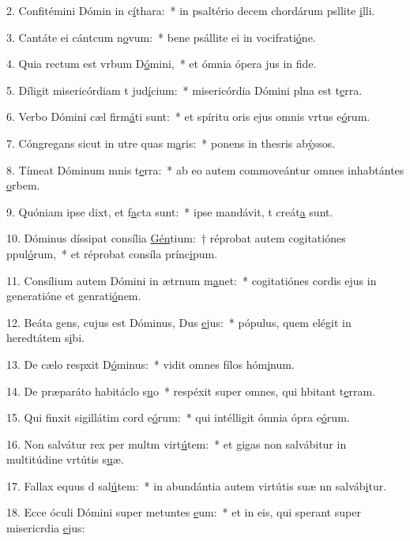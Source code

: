 2. Confitémini Dómin in c\uline{í}thara:~* in psaltério decem chordárum psllite \uline{i}lli.\par 
3. Cantáte ei cántcum n\uline{o}vum:~* bene psállite ei in vocifrati\uline{ó}ne.\par 
4. Quia rectum est vrbum D\uline{ó}mini,~* et ómnia ópera jus in f\uline{i}de.\par 
5. Díligit misericórdiam t jud\uline{í}cium:~* misericórdia Dómini plna est t\uline{e}rra.\par 
6. Verbo Dómini cæl firm\uline{á}ti sunt:~* et spíritu oris ejus omnis vrtus e\uline{ó}rum.\par 
7. Cóngregans sicut in utre quas m\uline{a}ris:~* ponens in thesris ab\uline{ý}ssos.\par 
8. Tímeat Dóminum mnis t\uline{e}rra:~* ab eo autem commoveántur omnes inhabtántes \uline{o}rbem.\par 
9. Quóniam ipse dixt, et f\uline{a}cta sunt:~* ipse mandávit, t creát\uline{a} sunt.\par 
10. Dóminus díssipat consília \uline{Gén}tium:~† réprobat autem cogitatiónes ppul\uline{ó}rum,~* et réprobat consíla prínc\uline{i}pum.\par 
11. Consílium autem Dómini in ætrnum m\uline{a}net:~* cogitatiónes cordis ejus in generatióne et genrati\uline{ó}nem.\par 
12. Beáta gens, cujus est Dóminus, Dus \uline{e}jus:~* pópulus, quem elégit in heredtátem s\uline{i}bi.\par 
13. De cælo respxit D\uline{ó}minus:~* vidit omnes fílos hóm\uline{i}num.\par 
14. De præparáto habitáclo s\uline{u}o~* respéxit super omnes, qui hbitant t\uline{e}rram.\par 
15. Qui finxit sigillátim cord e\uline{ó}rum:~* qui intélligit ómnia ópra e\uline{ó}rum.\par 
16. Non salvátur rex per multm virt\uline{ú}tem:~* et gigas non salvábitur in multitúdine vrtútis s\uline{u}æ.\par 
17. Fallax equus d sal\uline{ú}tem:~* in abundántia autem virtútis suæ nn salváb\uline{i}tur.\par 
18. Ecce óculi Dómini super metuntes \uline{e}um:~* et in eis, qui sperant super misericrdia \uline{e}jus:\par 
